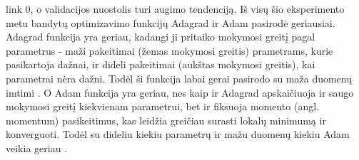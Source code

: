 \documentclass{VUMIFPSkursinis}
\begin{document}
\begin{enumerate}
link 0, o validacijos nuostolis turi augimo tendenciją.
Iš visų šio eksperimento metu bandytų optimizavimo funkcijų Adagrad ir Adam pasirodė geriausiai. Adagrad funkcija yra geriau, kadangi ji pritaiko mokymosi greitį pagal 
parametrus - maži pakeitimai (žemas mokymosi greitis) prametrams, kurie pasikartoja dažnai, ir dideli pakeitimai (aukštas mokymosi greitis), kai parametrai nėra dažni. Todėl ši funkcija labai gerai pasirodo su maža duomenų imtimi \cite{2016arXiv161106652K}. O Adam funkcija yra geriau, nes kaip ir Adagrad apskaičiuoja ir saugo mokymosi greitį kiekvienam parametrui, bet ir fiksuoja momento (angl. 
momentum) pasikeitimus, kas leidžia greičiau surasti lokalų minimumą ir konverguoti. Todėl su dideliu kiekiu parametrų ir mažu duomenų kiekiu Adam veikia geriau \cite{DBLP:journals/corr/KingmaB14}.
\end{enumerate}

\printbibliography[heading=bibintoc] 
\end{document}
